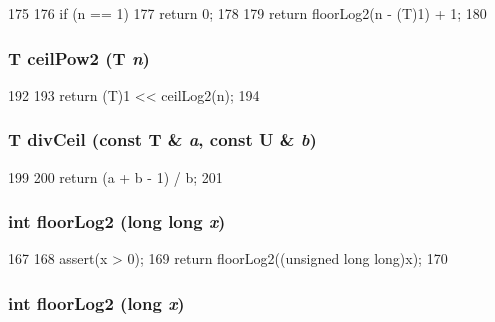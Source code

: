 \begin{DoxyCode}
175 {
176     if (n == 1)
177         return 0;
178 
179     return floorLog2(n - (T)1) + 1;
180 }
\end{DoxyCode}
\hypertarget{intmath_8hh_a334dc85c238ca64b4e9658e05cec6cba}{
\subsubsection[{ceilPow2}]{\setlength{\rightskip}{0pt plus 5cm}T ceilPow2 (T {\em n})}}
\label{intmath_8hh_a334dc85c238ca64b4e9658e05cec6cba}



\begin{DoxyCode}
192 {
193     return (T)1 << ceilLog2(n);
194 }
\end{DoxyCode}
\hypertarget{intmath_8hh_ae842b412d3570df97a944085b8f85850}{
\subsubsection[{divCeil}]{\setlength{\rightskip}{0pt plus 5cm}T divCeil (const T \& {\em a}, \/  const U \& {\em b})}}
\label{intmath_8hh_ae842b412d3570df97a944085b8f85850}



\begin{DoxyCode}
199 {
200     return (a + b - 1) / b;
201 }
\end{DoxyCode}
\hypertarget{intmath_8hh_a74b8ca802c979ca07b3f7bdddca9264d}{
\subsubsection[{floorLog2}]{\setlength{\rightskip}{0pt plus 5cm}int floorLog2 (long long {\em x})}}
\label{intmath_8hh_a74b8ca802c979ca07b3f7bdddca9264d}



\begin{DoxyCode}
167 {
168     assert(x > 0);
169     return floorLog2((unsigned long long)x);
170 }
\end{DoxyCode}
\hypertarget{intmath_8hh_aaa5523260849f943356b4ae7955d1384}{
\subsubsection[{floorLog2}]{\setlength{\rightskip}{0pt plus 5cm}int floorLog2 (long {\em x})}}
\label{intmath_8hh_aaa5523260849f943356b4ae7955d1384}



